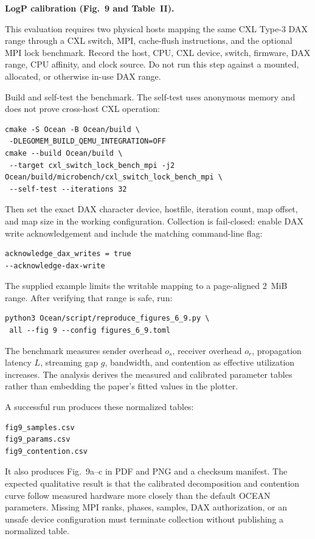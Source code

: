 \documentclass[conference]{IEEEtran}
\begin{document}
\noindent\textbf{LogP calibration (Fig.~9 and Table~II).}

\artin

This evaluation requires two physical hosts mapping the same CXL Type-3 DAX
range through a CXL switch, MPI, cache-flush instructions, and the optional
MPI lock benchmark.  Record the host, CPU,
CXL device, switch, firmware, DAX range, CPU affinity, and clock source.  Do
not run this step against a mounted, allocated, or otherwise in-use DAX range.

\artcomp

Build and self-test the benchmark.  The self-test uses anonymous memory and
does not prove cross-host CXL operation:
\begin{verbatim}
cmake -S Ocean -B Ocean/build \
 -DLEGOMEM_BUILD_QEMU_INTEGRATION=OFF
cmake --build Ocean/build \
 --target cxl_switch_lock_bench_mpi -j2
Ocean/build/microbench/cxl_switch_lock_bench_mpi \
 --self-test --iterations 32
\end{verbatim}
Then set the exact DAX character device, hostfile, iteration count, map offset,
and map size in the working configuration.  Collection is fail-closed: enable
DAX write acknowledgement and include the matching command-line flag:
\begin{verbatim}
acknowledge_dax_writes = true
--acknowledge-dax-write
\end{verbatim}
The supplied example limits the writable mapping to a page-aligned 2~MiB
range.  After verifying that range is safe, run:
\begin{verbatim}
python3 Ocean/script/reproduce_figures_6_9.py \
 all --fig 9 --config figures_6_9.toml
\end{verbatim}
The benchmark measures sender overhead $o_s$, receiver overhead $o_r$,
propagation latency $L$, streaming gap $g$, bandwidth, and contention as
effective utilization increases.  The analysis derives the measured and
calibrated parameter tables rather than embedding the paper's fitted values in
the plotter.

\artout

A successful run produces these normalized tables:
\begin{verbatim}
fig9_samples.csv
fig9_params.csv
fig9_contention.csv
\end{verbatim}
It also produces Fig.~9a--c in PDF and PNG and a checksum manifest.  The
expected qualitative result is
that the calibrated decomposition and contention curve follow measured
hardware more closely than the default OCEAN parameters.  Missing MPI ranks,
phases, samples, DAX authorization, or an unsafe device configuration must
terminate collection without publishing a normalized table.
\end{document}
